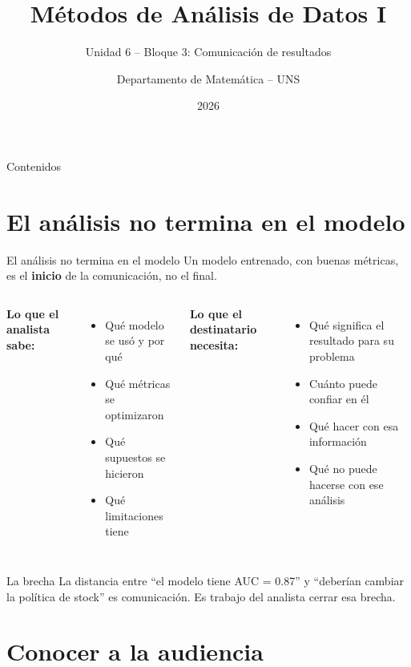 \documentclass[aspectratio=169]{beamer}
\title[MAD1 -- U6]{Métodos de Análisis de Datos I}
\subtitle{Unidad 6 -- Bloque 3: Comunicación de resultados}
\author{Departamento de Matemática -- UNS}
\date{2026}
\begin{document}
\begin{frame}
  \titlepage
\end{frame}

\begin{frame}{Contenidos}
  \tableofcontents
\end{frame}

\section{El análisis no termina en el modelo}

\begin{frame}{El análisis no termina en el modelo}
  Un modelo entrenado, con buenas métricas, es el \textbf{inicio} de la comunicación, no el final.

  \bigskip
  \begin{columns}
      \textbf{Lo que el analista sabe:}
      \begin{itemize}
        \item Qué modelo se usó y por qué
        \item Qué métricas se optimizaron
        \item Qué supuestos se hicieron
        \item Qué limitaciones tiene
      \end{itemize}
      \textbf{Lo que el destinatario necesita:}
      \begin{itemize}
        \item Qué significa el resultado para su problema
        \item Cuánto puede confiar en él
        \item Qué hacer con esa información
        \item Qué no puede hacerse con ese análisis
      \end{itemize}
  \end{columns}

  \bigskip
  \begin{alertblock}{La brecha}
    La distancia entre ``el modelo tiene AUC = 0.87'' y ``deberían cambiar la política de stock'' es comunicación. Es trabajo del analista cerrar esa brecha.
  \end{alertblock}
\end{frame}

\section{Conocer a la audiencia}
\end{document}
